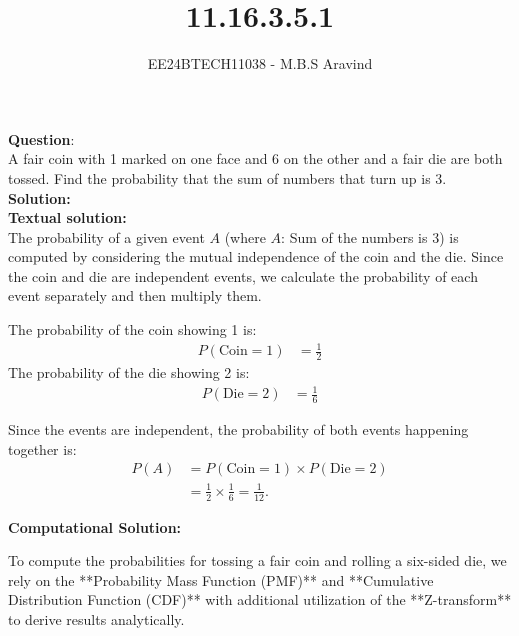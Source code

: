 \documentclass[journal]{IEEEtran}
\begin{document}

\vspace{3cm}

\title{11.16.3.5.1}
\author{EE24BTECH11038 - M.B.S Aravind}
{\let\newpage\relax\maketitle}

\renewcommand{\thefigure}{\theenumi}
\renewcommand{\thetable}{\theenumi}
\setlength{\intextsep}{10pt} %

\renewcommand{\thetable}{\theenumi}

\textbf{Question}:\\ 

A fair coin with 1 marked on one face and 6 on the other and a fair die are both tossed. Find the probability that the sum of numbers that turn up is 3.\\

\textbf{Solution: }\\
\textbf{Textual solution: }\\
The probability of a given event $A$ (where $A$: Sum of the numbers is 3) is computed by considering the mutual independence of the coin and the die. Since the coin and die are independent events, we calculate the probability of each event separately and then multiply them.

The probability of the coin showing 1 is:
\begin{align}
P(\text{Coin} = 1) &= \frac{1}{2}
\end{align}
The probability of the die showing 2 is:
\begin{align}
P(\text{Die} = 2) &= \frac{1}{6}
\end{align}

Since the events are independent, the probability of both events happening together is:
\begin{align}
P(A) &= P(\text{Coin} = 1) \times P(\text{Die} = 2) \\
     &= \frac{1}{2} \times \frac{1}{6} = \frac{1}{12}.
\end{align}

\textbf{Computational Solution:}


To compute the probabilities for tossing a fair coin and rolling a six-sided die, we rely on the **Probability Mass Function (PMF)** and **Cumulative Distribution Function (CDF)** with additional utilization of the **Z-transform** to derive results analytically.
\end{document}
